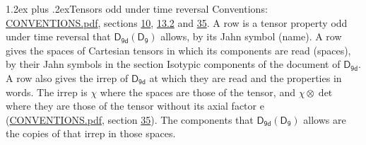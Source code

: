 \documentclass[10pt,a4paper]{article}
\makeatletter
\renewcommand\section{\@startsection{section}{1}{\z@}{-3ex plus -1ex minus -.2ex}%
  {1.2ex plus .2ex}{\normalfont\large\sffamily\bfseries\color{parttitle}}}
\numberwithin{equation}{section}
\newcommand{\grp}[1]{\mathsf{#1}}
\newcommand{\irrprod}{\otimes}
\makeatother
\begin{document}
\section{Tensors odd under time reversal}\label{s:time_odd}
Conventions: \href{../../CONVENTIONS.pdf}{CONVENTIONS.pdf}, sections \href{../../../rotation/CONVENTIONS.pdf\#conv.10}{10}, \href{../../../rotation/CONVENTIONS.pdf\#conv.13.2}{13.2} and \href{../../CONVENTIONS.pdf\#conv.35}{35}.
\leavevmode\label{n:head.name.property}A row is a tensor property odd under time reversal that $\grp{D_{9d}}(\grp{D_{9}})$ allows, by its Jahn symbol (name). \label{n:head.spaces}A row gives the spaces of Cartesian tensors in which its components are read (spaces), by their Jahn symbols in the section Isotypic components of the document of \href{../../../rotation/data/pdf/D9d.pdf}{$\grp{D_{9d}}$}. \label{n:head.properties}A row also gives the irrep of $\grp{D_{9d}}$ at which they are read and the properties in words. The irrep is $\chi$ where the spaces are those of the tensor, and $\chi \irrprod \det$ where they are those of the tensor without its axial factor e (\href{../../CONVENTIONS.pdf}{CONVENTIONS.pdf}, section \href{../../CONVENTIONS.pdf\#conv.35}{35}). The components that $\grp{D_{9d}}(\grp{D_{9}})$ allows are the copies of that irrep in those spaces.
\end{document}
